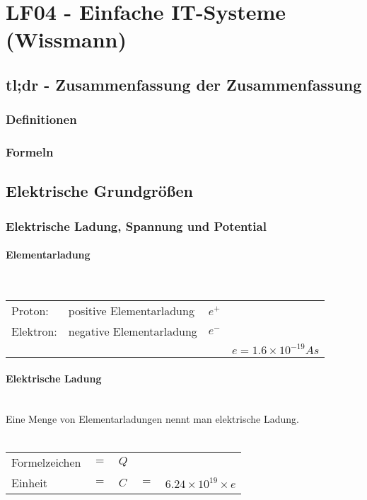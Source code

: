 \section{LF04 - Einfache IT-Systeme (Wissmann)}


\subsection{tl;dr - Zusammenfassung der Zusammenfassung}

\subsubsection{Definitionen}

\subsubsection{Formeln}


\subsection{Elektrische Grundgrößen}
	\subsubsection{Elektrische Ladung, Spannung und Potential}
		\paragraph{Elementarladung}~\\
		
\begin{tabular}{llll}
Proton:		& positive Elementarladung &	$e^+$ & \\
Elektron:	& negative Elementarladung &	$e^-$ & \\
& &	& $e = 1.6 \times 10^{-19} As$ \\
\end{tabular}

		\paragraph{Elektrische Ladung}~\\
		
\noindent Eine Menge von Elementarladungen nennt man elektrische Ladung.\\\\
\begin{tabular}{lllll}
Formelzeichen	& $=$ & $Q$ & & \\
Einheit			& $=$ & $C$ & $=$ & $6.24 \times 10^{19} \times e$
\end{tabular}	
		
